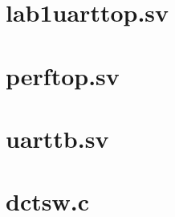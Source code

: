 \documentclass[a4paper]{article}
\begin{document}
\newpage
\begin{appendices}
\begin{changemargin}{-3cm}{-3cm} 

\section{lab1uarttop.sv}

\newpage
\section{perftop.sv}

\newpage
\section{uarttb.sv}

\newpage
\section{dctsw.c}

\end{changemargin}
\end{appendices}
\end{document}
